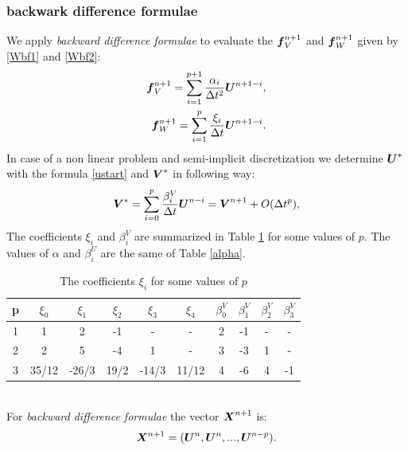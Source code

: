 \documentclass[english,a4paper]{article}
\newcommand{\Xbf}{\text{\mbox{\boldmath $X$}}}
\newcommand{\Ubf}{\text{\mbox{\boldmath $U$}}}
\newcommand{\Abf}{\text{\mbox{\boldmath $W$}}}
\newcommand{\fbf}{\text{\mbox{\boldmath $f$}}}
\newcommand{\Wbf}{\text{\mbox{\boldmath $V$}}}
\begin{document}
\subsubsection{backwark difference formulae}
We apply {\sl backward difference formulae } to evaluate the $\fbf_V^{n+1}$
and $\fbf_W^{n+1}$  given by \eqref{Wbf1} and \eqref{Wbf2}: 
\begin{eqnarray*}
\displaystyle\fbf_V^{n+1}=\sum_{i=1}^{p+1}\frac{\alpha_i}{\Delta
  t^2}\Ubf^{n+1-i},
\\
\displaystyle\fbf_W^{n+1}=\sum_{i=1}^p\frac{\xi_i}{\Delta t}\Ubf^{n+1-i}.
\end{eqnarray*}
In case of a non linear problem and semi-implicit discretization we
determine $\Ubf^*$ with the formula \eqref{ustart} and $\Wbf^*$ in
following way:
\begin{equation}\label{ustart}
\Wbf^*=\sum_{i=0}^p \frac{\beta_i^V}{\Delta t}\Ubf^{n-i}=\Wbf^{n+1}+O(\Delta t^p),
\end{equation}
The coefficients $\xi_i$ and $\beta_i^V$ are summarized in Table \ref{xi} for some values
of $p$. The values of $\alpha$ and $\beta_i^U$ are the same of  Table \ref{alpha}. 
\begin{table}[!htp]
\begin{center}
\begin{tabular}{| c | c c c c c | c c c c | }
\hline
p & $\xi_0$ & $\xi_1$ &  $\xi_2$  & $\xi_3$ & $\xi_4$ & $\beta_0^V$
&$\beta_1^V$ &$\beta_2^V$ &$\beta_3^V$  \\  
\hline
1 &  1      &   2    &    -1      &   -    &    -  & 2 & -1 & - & -  \\
2 &  2      &   5    &    -4      &   1   &    -   & 3 & -3 & 1 & -  \\
3 & 35/12   &  -26/3  &   19/2    &  -14/3 & 11/12 & 4 & -6 & 4 & -1 \\
\hline
\end{tabular}
\end{center}
\caption{The coefficients $\xi_i$  for some values of
$p$ }\label{xi}
\end{table} 
\\
For  {\sl backward difference formulae} the vector $\Xbf^{n+1}$ is:
$$\Xbf^{n+1}=(\Ubf^{n}, \Ubf^n,..., \Ubf^{n-p}).$$
\end{document}
